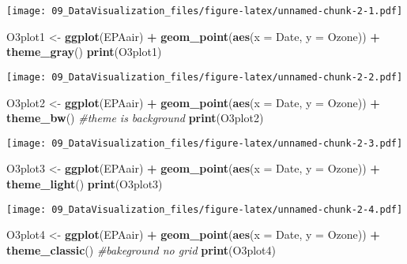 \documentclass[]{article}
\newenvironment{Shaded}{\begin{snugshade}}{\end{snugshade}}
\newcommand{\CommentTok}[1]{\textcolor[rgb]{0.56,0.35,0.01}{\textit{#1}}}
\newcommand{\DataTypeTok}[1]{\textcolor[rgb]{0.13,0.29,0.53}{#1}}
\newcommand{\KeywordTok}[1]{\textcolor[rgb]{0.13,0.29,0.53}{\textbf{#1}}}
\newcommand{\NormalTok}[1]{#1}
\newcommand{\OperatorTok}[1]{\textcolor[rgb]{0.81,0.36,0.00}{\textbf{#1}}}
\newcommand{\StringTok}[1]{\textcolor[rgb]{0.31,0.60,0.02}{#1}}
\begin{document}
\texttt{[image: 09\_DataVisualization\_files/figure-latex/unnamed-chunk-2-1.pdf]}

\begin{Shaded}
\begin{Highlighting}[]
\NormalTok{O3plot1 <-}\StringTok{ }\KeywordTok{ggplot}\NormalTok{(EPAair) }\OperatorTok{+}
\StringTok{  }\KeywordTok{geom_point}\NormalTok{(}\KeywordTok{aes}\NormalTok{(}\DataTypeTok{x =}\NormalTok{ Date, }\DataTypeTok{y =}\NormalTok{ Ozone)) }\OperatorTok{+}
\StringTok{  }\KeywordTok{theme_gray}\NormalTok{()}
\KeywordTok{print}\NormalTok{(O3plot1)}
\end{Highlighting}
\end{Shaded}

\texttt{[image: 09\_DataVisualization\_files/figure-latex/unnamed-chunk-2-2.pdf]}

\begin{Shaded}
\begin{Highlighting}[]
\NormalTok{O3plot2 <-}\StringTok{ }\KeywordTok{ggplot}\NormalTok{(EPAair) }\OperatorTok{+}
\StringTok{  }\KeywordTok{geom_point}\NormalTok{(}\KeywordTok{aes}\NormalTok{(}\DataTypeTok{x =}\NormalTok{ Date, }\DataTypeTok{y =}\NormalTok{ Ozone)) }\OperatorTok{+}
\StringTok{  }\KeywordTok{theme_bw}\NormalTok{()  }\CommentTok{#theme is background}
\KeywordTok{print}\NormalTok{(O3plot2)}
\end{Highlighting}
\end{Shaded}

\texttt{[image: 09\_DataVisualization\_files/figure-latex/unnamed-chunk-2-3.pdf]}

\begin{Shaded}
\begin{Highlighting}[]
\NormalTok{O3plot3 <-}\StringTok{ }\KeywordTok{ggplot}\NormalTok{(EPAair) }\OperatorTok{+}
\StringTok{  }\KeywordTok{geom_point}\NormalTok{(}\KeywordTok{aes}\NormalTok{(}\DataTypeTok{x =}\NormalTok{ Date, }\DataTypeTok{y =}\NormalTok{ Ozone)) }\OperatorTok{+}
\StringTok{  }\KeywordTok{theme_light}\NormalTok{()}
\KeywordTok{print}\NormalTok{(O3plot3)}
\end{Highlighting}
\end{Shaded}

\texttt{[image: 09\_DataVisualization\_files/figure-latex/unnamed-chunk-2-4.pdf]}

\begin{Shaded}
\begin{Highlighting}[]
\NormalTok{O3plot4 <-}\StringTok{ }\KeywordTok{ggplot}\NormalTok{(EPAair) }\OperatorTok{+}
\StringTok{  }\KeywordTok{geom_point}\NormalTok{(}\KeywordTok{aes}\NormalTok{(}\DataTypeTok{x =}\NormalTok{ Date, }\DataTypeTok{y =}\NormalTok{ Ozone)) }\OperatorTok{+}
\StringTok{  }\KeywordTok{theme_classic}\NormalTok{() }\CommentTok{#bakeground no grid}
\KeywordTok{print}\NormalTok{(O3plot4)}
\end{Highlighting}
\end{Shaded}
\end{document}
